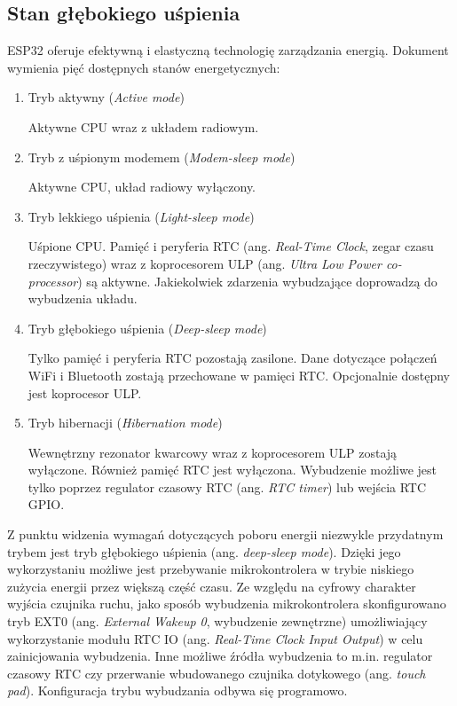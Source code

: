         \subsection{Stan głębokiego uśpienia}

            ESP32 oferuje efektywną i elastyczną technologię zarządzania energią. Dokument \cite{esp32-ds} wymienia pięć dostępnych stanów energetycznych:

            \begin{enumerate}
                \item Tryb aktywny (\textit{Active mode})

                    Aktywne CPU wraz z układem radiowym.

                \item Tryb z uśpionym modemem (\textit{Modem-sleep mode})

                    Aktywne CPU, układ radiowy wyłączony.
                
                \item Tryb lekkiego uśpienia (\textit{Light-sleep mode})

                    Uśpione CPU. Pamięć i peryferia RTC (ang. \textit{Real-Time Clock}, zegar czasu rzeczywistego) wraz z koprocesorem ULP (ang. \textit{Ultra Low Power co-processor}) są aktywne. Jakiekolwiek zdarzenia wybudzające doprowadzą do wybudzenia układu.

                \item Tryb głębokiego uśpienia (\textit{Deep-sleep mode})

                    Tylko pamięć i peryferia RTC pozostają zasilone. Dane dotyczące połączeń WiFi i Bluetooth zostają przechowane w pamięci RTC. Opcjonalnie dostępny jest koprocesor ULP.

                \item Tryb hibernacji (\textit{Hibernation mode})

                    Wewnętrzny rezonator kwarcowy wraz z koprocesorem ULP zostają wyłączone. Również pamięć RTC jest wyłączona. Wybudzenie możliwe jest tylko poprzez regulator czasowy RTC (ang. \textit{RTC timer}) lub wejścia RTC GPIO.

            \end{enumerate}

            Z punktu widzenia wymagań dotyczących poboru energii niezwykle przydatnym trybem jest tryb głębokiego uśpienia (ang. \textit{deep-sleep mode}). Dzięki jego wykorzystaniu możliwe jest przebywanie mikrokontrolera w trybie niskiego zużycia energii przez większą część czasu. Ze względu na cyfrowy charakter wyjścia czujnika ruchu, jako sposób wybudzenia mikrokontrolera skonfigurowano tryb EXT0 (ang. \textit{External Wakeup 0}, wybudzenie zewnętrzne) umożliwiający wykorzystanie modułu RTC IO (ang. \textit{Real-Time Clock Input Output}) w celu zainicjowania wybudzenia. Inne możliwe źródła wybudzenia to m.in. regulator czasowy RTC czy przerwanie wbudowanego czujnika dotykowego (ang. \textit{touch pad}). Konfiguracja trybu wybudzania odbywa się programowo.


